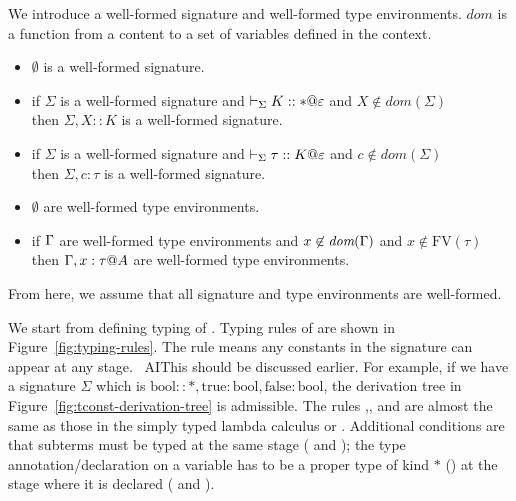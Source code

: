 We introduce a well-formed signature and well-formed type environments.
$\textit{dom}$ is a function from a content to a set of variables defined in the context.
\begin{definition}
    \begin{itemize}
        \item $\emptyset$ is a well-formed signature.
        \item if $\Sigma$ is a well-formed signature and $\vdash_\Sigma K :: * @ \varepsilon$ and $X\notin\textit{dom}(\Sigma)$ \\
              then $\Sigma,X::K$ is a well-formed signature.
        \item if $\Sigma$ is a well-formed signature and $\vdash_\Sigma \tau :: K @ \varepsilon$ and $c\notin\textit{dom}(\Sigma)$ \\
              then $\Sigma,c:\tau$ is a well-formed signature.
    \end{itemize}
\end{definition}
\begin{definition}
    \begin{itemize}
        \item $\emptyset$ are well-formed type environments.
        \item if $\Gamma$ are well-formed type environments and $x\not\in\textit{dom}(\Gamma)$ and $x\not\in\textrm{FV}(\tau)$ \\
              then $\G,x:\tau@A$ are well-formed type environments.
    \end{itemize}
\end{definition}
From here, we assume that all signature and type environments are well-formed.

We start from defining typing of
\LMD.  Typing rules of \LMD are shown in Figure~\ref{fig:typing-rules}.
The rule \TConst{} means any constants in the
signature can appear at any stage.  \
AI{This should be discussed earlier.}
For example, if we have a signature $\Sigma$ which is
$\textrm{bool} :: *, \textrm{true}: \textrm{bool}, \textrm{false}:
    \textrm{bool}$, the derivation tree in
Figure~\ref{fig:tconst-derivation-tree} is admissible.
The rules \TVar,\TAbs, and \TApp{} are almost the same as those in the simply typed
lambda calculus or \LLF.  Additional conditions are that subterms must be
typed at the same stage (\TAbs{} and \TApp); the type
annotation/declaration on a variable has to be a proper type of kind
$*$ (\TAbs) at the stage where it is declared (\TVar{} and \TAbs).

